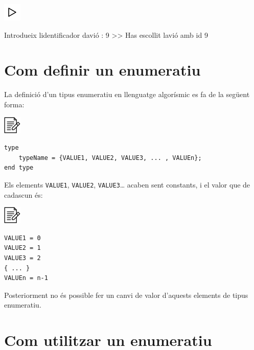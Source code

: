 \documentclass[]{book}
\newenvironment{Shaded}{\begin{snugshade}}{\end{snugshade}}
\newcommand{\DecValTok}[1]{\textcolor[rgb]{0.00,0.00,0.81}{#1}}
\newcommand{\NormalTok}[1]{#1}
\begin{document}
\includegraphics{./img/play.png}

\begin{Shaded}
\begin{Highlighting}[]
\NormalTok{Introdueix l\textquotesingle{}identificador d\textquotesingle{}avió : }\DecValTok{9}
\NormalTok{\textgreater{}\textgreater{} Has escollit l\textquotesingle{}avió amb id }\DecValTok{9} 
\end{Highlighting}
\end{Shaded}

\hypertarget{com-definir-un-enumeratiu}{%
\section{Com definir un enumeratiu}\label{com-definir-un-enumeratiu}}

La definició d'un tipus enumeratiu en llenguatge algorísmic es fa de la següent forma:

\includegraphics{./img/alg.png}

\begin{verbatim}
type
    typeName = {VALUE1, VALUE2, VALUE3, ... , VALUEn};
end type
\end{verbatim}

Els elements \texttt{VALUE1}, \texttt{VALUE2}, \texttt{VALUE3}\ldots{} acaben sent constants, i el valor que de cadascun és:

\includegraphics{./img/alg.png}

\begin{verbatim}
VALUE1 = 0
VALUE2 = 1
VALUE3 = 2 
{ ... }
VALUEn = n-1
\end{verbatim}

Posteriorment no és possible fer un canvi de valor d'aquests elements de tipus enumeratiu.

\hypertarget{com-utilitzar-un-enumeratiu}{%
\section{Com utilitzar un enumeratiu}\label{com-utilitzar-un-enumeratiu}}
\end{document}
